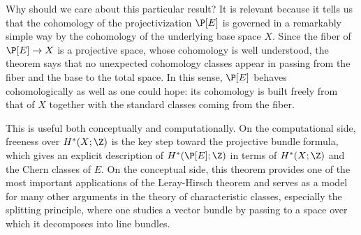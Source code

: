 Why should we care about this particular result?
It is relevant because it tells us that the cohomology of the projectivization $\P[E]$ is governed in a remarkably simple way by the cohomology of the underlying base space $X$. Since the fiber of $\P[E]\to X$ is a projective space, whose cohomology is well understood, the theorem says that no unexpected cohomology classes appear in passing from the fiber and the base to the total space. In this sense, $\P[E]$ behaves cohomologically as well as one could hope: its cohomology is built freely from that of $X$ together with the standard classes coming from the fiber.

This is useful both conceptually and computationally. On the computational side, freeness over $H^*(X;\Z)$ is the key step toward the projective bundle formula, which gives an explicit description of $H^*(\P[E];\Z)$ in terms of $H^*(X;\Z)$ and the Chern classes of $E$. On the conceptual side, this theorem provides one of the most important applications of the Leray-Hirsch theorem and serves as a model for many other arguments in the theory of characteristic classes, especially the splitting principle, where one studies a vector bundle by passing to a space over which it decomposes into line bundles.
